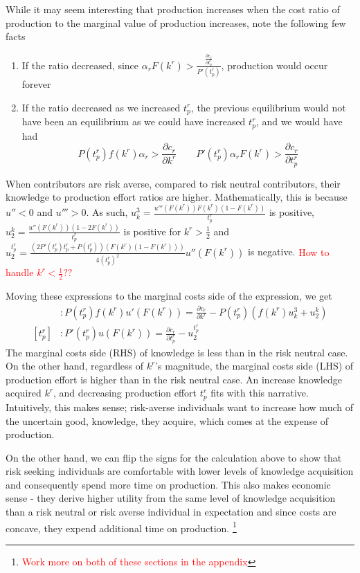 \documentclass[source/paper/main.tex]{subfiles}
\begin{document}
While it may seem interesting that production increases when the cost ratio of production to the marginal value of production increases, note the following few facts
\begin{enumerate}
    \item If the ratio decreased, since $\alpha_r F(k^r) > \frac{\frac{\partial c_r}{\partial t_p^r}}{P'(t_p^r)}$, production would occur forever
    \item If the ratio decreased as we increased $t_p^r$, the previous equilibrium would not have been an equilibrium as we could have increased $t_p^r$, and we would have had
    $$P(t_p^r)f(k^r)\alpha_r > \frac{\partial c_r}{\partial k^r} \qquad P'(t_p^r)\alpha_r F(k^r) > \frac{\partial c_r}{\partial t_p^r}$$
\end{enumerate}
When contributors are risk averse, compared to risk neutral contributors, their knowledge to production effort ratios are higher. Mathematically, this is because $u'' < 0$ and $u''' > 0$. As such,
$u_k^3 = \frac{u'''(F(k^r))F(k^r)(1-F(k^r))}{t_p^r}$ is positive, $u_2^k = \frac{u''(F(k^r))  (1-2F(k^r))}{t_p^r}$ is positive for $k^r > \frac12$ and $u_2^{t_p^r} = \frac{(2P'(t_p^r)t_p^r + P(t_p^r))(F(k^r)(1-F(k^r)))}{4(t_p^r)^2}u''(F(k^r))$ is negative. \textcolor{red}{How to handle $k^r< \frac12??$}

Moving these expressions to the marginal costs side of the expression, we get
\begin{align*}
    [k^r] &: P(t_p^r)f(k^r)u'(F(k^r)) = \frac{\partial c_r}{\partial k^r} - P(t_p^r)(f(k^r)u_k^3 + u_2^k)\\
    [t_p^r] &: P'(t_p^r) u(F(k^r)) = \frac{\partial c_r}{\partial t_p^r} - u_2^{t_p^r} 
\end{align*}
The marginal costs side (RHS) of knowledge is less than in the risk neutral case. On the other hand, regardless of $k^r$'s magnitude, the marginal costs side (LHS) of production effort is higher than in the risk neutral case. An increase knowledge acquired $k^r$, and decreasing production effort $t_p^r$ fits with this narrative. Intuitively, this makes sense; risk-averse individuals want to increase how much of the uncertain good, knowledge, they acquire, which comes at the expense of production.

On the other hand, we can flip the signs for the calculation above to show that risk seeking individuals are comfortable with lower levels of knowledge acquisition and consequently spend more time on production. This also makes economic sense - they derive higher utility from the same level of knowledge acquisition than a risk neutral or risk averse individual in expectation and since costs are concave, they expend additional time on production. \footnote{\textcolor{red}{Work more on both of these sections in the appendix}}
\end{document}
